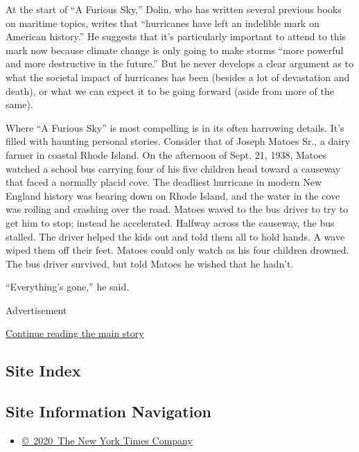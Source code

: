 At the start of ``A Furious Sky,'' Dolin, who has written several
previous books on maritime topics, writes that ``hurricanes have left an
indelible mark on American history.'' He suggests that it's particularly
important to attend to this mark now because climate change is only
going to make storms ``more powerful and more destructive in the
future.'' But he never develops a clear argument as to what the societal
impact of hurricanes has been (besides a lot of devastation and death),
or what we can expect it to be going forward (aside from more of the
same).

Where ``A Furious Sky'' is most compelling is in its often harrowing
details. It's filled with haunting personal stories. Consider that of
Joseph Matoes Sr., a dairy farmer in coastal Rhode Island. On the
afternoon of Sept. 21, 1938, Matoes watched a school bus carrying four
of his five children head toward a causeway that faced a normally placid
cove. The deadliest hurricane in modern New England history was bearing
down on Rhode Island, and the water in the cove was roiling and crashing
over the road. Matoes waved to the bus driver to try to get him to stop;
instead he accelerated. Halfway across the causeway, the bus stalled.
The driver helped the kids out and told them all to hold hands. A wave
wiped them off their feet. Matoes could only watch as his four children
drowned. The bus driver survived, but told Matoes he wished that he
hadn't.

``Everything's gone,'' he said.

Advertisement

\protect\hyperlink{after-bottom}{Continue reading the main story}

\hypertarget{site-index}{%
\subsection{Site Index}\label{site-index}}

\hypertarget{site-information-navigation}{%
\subsection{Site Information
Navigation}\label{site-information-navigation}}

\begin{itemize}
\tightlist
\item
  \href{https://help.nytimes3xbfgragh.onion/hc/en-us/articles/115014792127-Copyright-notice}{©~2020~The
  New York Times Company}
\end{itemize}

